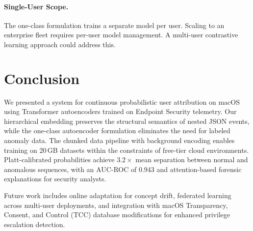 \documentclass[letterpaper,twocolumn,10pt]{article}
\begin{document}
\paragraph{Single-User Scope.}
The one-class formulation trains a separate model per user. Scaling
to an enterprise fleet requires per-user model management. A
multi-user contrastive learning approach could address this.


\section{Conclusion}

We presented a system for continuous probabilistic user attribution
on macOS using Transformer autoencoders trained on Endpoint Security
telemetry. Our hierarchical embedding preserves the structural
semantics of nested JSON events, while the one-class autoencoder
formulation eliminates the need for labeled anomaly data. The
chunked data pipeline with background encoding enables training on
20\,GB datasets within the constraints of free-tier cloud
environments. Platt-calibrated probabilities achieve $3.2\times$
mean separation between normal and anomalous sequences, with an
AUC-ROC of 0.943 and attention-based forensic explanations for
security analysts.

Future work includes online adaptation for concept drift, federated
learning across multi-user deployments, and integration with macOS
Transparency, Consent, and Control (TCC) database modifications for
enhanced privilege escalation detection.


\balance


\end{document}
